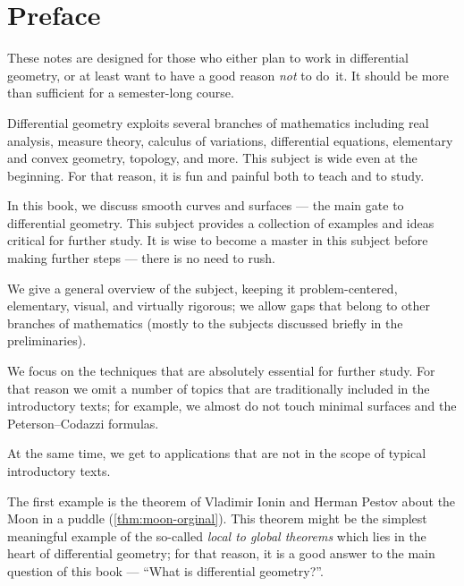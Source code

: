 \vfill

\newpage
\chapter*{Preface}
\thispagestyle{myheadings}

These notes are designed for those who either plan to work in differential geometry,
or at least want to have a good reason \textit{not} to do~it.
It should be more than sufficient for a semester-long course. 

Differential geometry exploits several branches of mathematics including 
real analysis, 
measure theory,
calculus of variations,
differential equations,
elementary and convex geometry,
topology, and more.
This subject is wide even at the beginning. 
For that reason, it is fun and painful both to teach and to study.

In this book, we discuss smooth curves and surfaces --- the main gate to differential geometry.
This subject provides a collection of examples and ideas critical for further study.
It is wise to become a master in this subject before making further steps --- there is no need to rush.

We give a general overview of the subject, keeping it
problem-centered,
elementary, 
visual, 
and virtually rigorous; we allow gaps that belong to other branches of mathematics (mostly to the subjects discussed briefly in the preliminaries).

We focus on the techniques that are absolutely essential for further study.
For  that reason we omit a number of topics that are traditionally included in the introductory texts;
for example, we almost do not touch 
minimal surfaces
and the Peterson--Codazzi formulas.

At the same time, we get to applications that are not in the scope of typical introductory texts.
 
The first example is the theorem of Vladimir Ionin and Herman Pestov about the Moon in a puddle (\ref{thm:moon-orginal}).
This theorem might be the simplest meaningful example of the so-called {}\emph{local to global theorems} which lies in the heart of differential geometry;
for that reason, it is a good answer to the main question of this book --- ``What is differential geometry?''.

